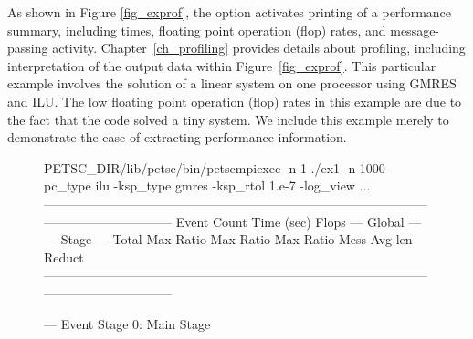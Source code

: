 {{As shown in Figure \ref{fig_exprof}, the option  activates printing of a performance summary, including
times, floating point operation (flop) rates, and message-passing
activity.  Chapter~\ref{ch_profiling}
provides details about profiling, including interpretation of the
output data within Figure~\ref{fig_exprof}.  This particular example involves the solution of a linear
system on one processor using GMRES and ILU.  The low floating point
operation (flop) rates in this example are due to the fact that the
code solved a tiny system.  We include this example merely to
demonstrate the ease of extracting performance information.

\begin{figure}[H]
{
  \begin{outputlisting}[\fontsize{7.5pt}{8pt}\ttfamily]
$ $PETSC_DIR/lib/petsc/bin/petscmpiexec -n 1 ./ex1 -n 1000 -pc_type ilu -ksp_type gmres -ksp_rtol 1.e-7 -log_view
...
------------------------------------------------------------------------------------------------------------------------
Event                Count      Time (sec)     Flops                             --- Global ---  --- Stage ---   Total
                   Max Ratio  Max     Ratio   Max  Ratio  Mess   Avg len Reduct  %
------------------------------------------------------------------------------------------------------------------------

--- Event Stage 0: Main Stage


\end{outputlisting}}
\end{figure}}}
